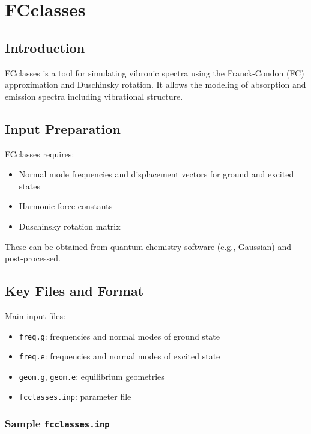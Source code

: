 \chapter{FCclasses}

\section{Introduction}

FCclasses is a tool for simulating vibronic spectra using the Franck-Condon (FC) approximation and Duschinsky rotation. It allows the modeling of absorption and emission spectra including vibrational structure.

\section{Input Preparation}

FCclasses requires:

\begin{itemize}
    \item Normal mode frequencies and displacement vectors for ground and excited states
    \item Harmonic force constants
    \item Duschinsky rotation matrix
\end{itemize}

These can be obtained from quantum chemistry software (e.g., Gaussian) and post-processed.

\section{Key Files and Format}

Main input files:

\begin{itemize}
    \item \texttt{freq.g}: frequencies and normal modes of ground state
    \item \texttt{freq.e}: frequencies and normal modes of excited state
    \item \texttt{geom.g}, \texttt{geom.e}: equilibrium geometries
    \item \texttt{fcclasses.inp}: parameter file
\end{itemize}

\subsection*{Sample \texttt{fcclasses.inp}}

